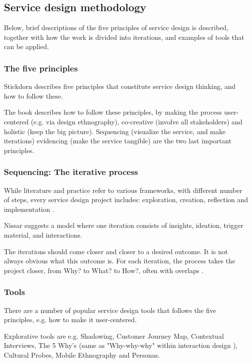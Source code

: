 \subsection{Service design methodology}

Below, brief descriptions of the five principles of service design is described, together with how the work is divided into iterations, and examples of tools that can be applied.

\subsubsection{The five principles}
Stickdorn \cite{stickdorn} describes five principles that constitute service design thinking, and how to follow these.

The book describes how to follow these principles, by making the process user-centered (e.g. via design ethnography), co-creative (involve all stakeholders) and holistic (keep the big picture). Sequencing (visualize the service, and make iterations) evidencing (make the service tangible) are the two last important principles.

\subsubsection{Sequencing: The iterative process}
While literature and practice refer to various frameworks, with different number of steps, every service design project includes: exploration, creation, reflection and implementation \cite{stickdorn}.

Nissar \cite{expedition-mondial} suggests a model where one iteration consists of insights, ideation, trigger material, and interactions.

The iterations should come closer and closer to a desired outcome. It is not always obvious what this outcome is. For each iteration, the process takes the project closer, from Why? to What? to How?, often with overlaps \cite{expedition-mondial}.

\subsubsection{Tools}

There are a number of popular service design tools that follows the five principles, e.g. how to make it user-centered.

Explorative tools are e.g. Shadowing, Customer Journey Map, Contextual Interviews, The 5 Why's (same as "Why-why-why" within interaction design \cite{thoughtful}), Cultural Probes, Mobile Ethnography and Personas.

